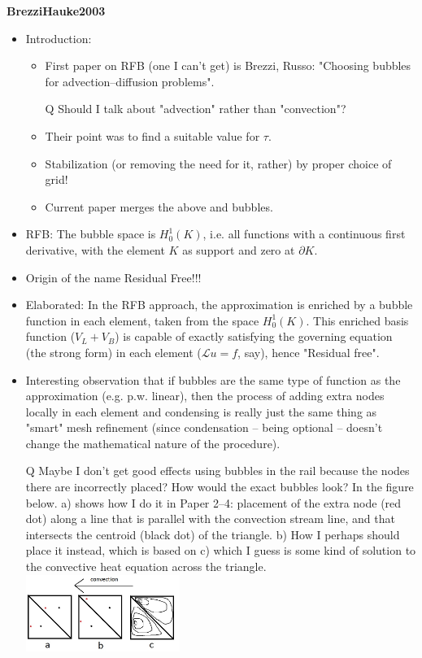 \documentclass{article}
\begin{document}
\textbf{BrezziHauke2003}
\begin{itemize}
\item Introduction:
\begin{itemize}
\item First paper on RFB (one I can't get) is Brezzi, Russo: "Choosing bubbles for advection--diffusion problems".
\item[Q] Should I talk about "advection" rather than "convection"?
\item Their point was to find a suitable value for $\tau$.
\item Stabilization (or removing the need for it, rather) by proper choice of grid!
\item Current paper merges the above and bubbles.
\end{itemize}
\item RFB: The bubble space is $H_0^1(K)$, i.e. all functions with a continuous first derivative, with the element $K$ as support and zero at $\partial K$.
\item Origin of the name Residual Free!!!
\item Elaborated: In the RFB approach, the approximation is enriched by a bubble function in each element, taken from the space $H_0^1(K)$. This enriched basis function ($V_L + V_B$) is capable of exactly satisfying the governing equation (the strong form) in each element ($\mathcal{L}u = f$, say), hence "Residual free".
\item Interesting observation that if bubbles are the same type of function as the approximation (e.g. p.w. linear), then the process of adding extra nodes locally in each element and condensing is really just the same thing as "smart" mesh refinement (since condensation -- being optional -- doesn't change the mathematical nature of the procedure).
\item[Q] Maybe I don't get good effects using bubbles in the rail because the nodes there are incorrectly placed? How would the exact bubbles look? In the figure below. a) shows how I do it in Paper 2--4: placement of the extra node (red dot) along a line that is parallel with the convection stream line, and that intersects the centroid (black dot) of the triangle. b) How I perhaps should place it instead, which is based on c) which I guess is some kind of solution to the convective heat equation across the triangle.
\includegraphics[width=5cm]{figures/BrezziHauke2003_img1.jpg}
\end{itemize}
\end{document}
